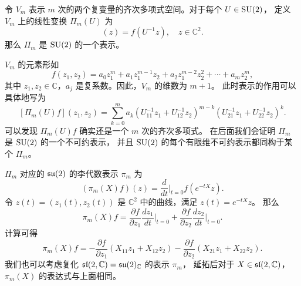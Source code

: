 \begin{example}
  令 $V_m$ 表示 $m$ 次的两个复变量的齐次多项式空间。对于每个 $U\in\operatorname{SU}(2)$，
  定义 $V_m$ 上的线性变换 $\Pi_m(U)$ 为
  \begin{equation}
    [\Pi_m(U)f](z)=f(U^{-1}z),\quad z\in \mathbb{C}^2.
  \end{equation}
  那么 $\Pi_m$ 是 $\operatorname{SU}(2)$ 的一个表示。

  $V_m$ 的元素形如
  \begin{equation}
    f(z_1,z_2)=a_0z_1^m+a_1z_1^{m-1}z_2+a_2z_1^{m-2}z_2^2+\cdots +a_mz_2^m,
  \end{equation}
  其中 $z_1,z_2\in \mathbb{C}$，$a_j$ 是复系数。因此，$V_m$ 的维数为 $m+1$。
  此时表示的作用可以具体地写为
  \[
    [\Pi_m(U)f](z_1,z_2)=\sum_{k=0}^m a_k
    (U_{11}^{-1}z_1+U_{12}^{-1}z_2)^{m-k}
    (U_{21}^{-1}z_1+U_{22}^{-1}z_2)^k.
  \]
  可以发现 $\Pi_m(U)f$ 确实还是一个 $m$ 次的齐次多项式。
  在后面我们会证明 $\Pi_m$ 是 $\operatorname{SU}(2)$ 的一个不可约表示，
  并且 $\operatorname{SU}(2)$ 的每个有限维不可约表示都同构于某个 $\Pi_m$。

  $\Pi_m$ 对应的 $\mathfrak{su}(2)$ 的李代数表示 $\pi_m$ 为
  \[
    (\pi_m(X)f)(z)=\frac{d}{dt}\bigg|_{t=0} f(e^{-tX}z).
  \]
  令 $z(t)=(z_1(t),z_2(t))$ 是 $\mathbb{C}^2$ 中的曲线，满足 $z(t)=e^{-tX}z$。
  那么
  \[
    \pi_m(X)f=\frac{\partial f}{\partial z_1}\frac{d z_1}{dt}\bigg|_{t=0}
    +\frac{\partial f}{\partial z_2}\frac{d z_2}{dt}\bigg|_{t=0}.
  \]
  计算可得
  \[
    \pi_m(X)f=-\frac{\partial f}{\partial z_1}(X_{11}z_1+X_{12}z_2)
    -\frac{\partial f}{\partial z_2}(X_{21}z_1+X_{22}z_2).
  \]
  我们也可以考虑复化 $\mathfrak{sl}(2,\mathbb{C})=\mathfrak{su}(2)_{\mathbb{C}}$ 的表示 $\pi_m$，
  延拓后对于 $X\in\mathfrak{sl}(2,\mathbb{C})$，$\pi_m(X)$ 的表达式与上面相同。


\end{example}
